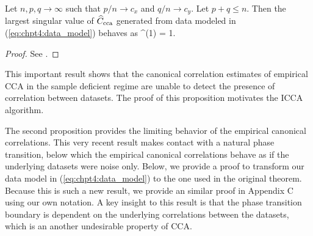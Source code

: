 \begin{prop}\label{prop:pezeshki}
Let $n,p,q\to\infty$ such that $p/n\to c_x$ and $q/n\to c_y$. Let $p+q\leq n$. Then the
largest singular value of $\widehat{C}_{\text{cca}}$ generated from data modeled in (\ref{eq:chpt4:data_model})
behaves as 
\be
\rhohatcca^{(1)} = 1.
\ee
\end{prop}
\begin{proof}
See \cite{pezeshki2004empirical}.
\end{proof}

This important result shows that the canonical correlation estimates of empirical CCA in
the sample deficient regime are unable to detect the presence of correlation between
datasets. The proof of this proposition motivates the ICCA algorithm. 

The second proposition provides the limiting behavior of the empirical canonical
correlations. This very recent result makes contact with a natural phase transition, below
which the empirical canonical correlations behave as if the underlying datasets were noise
only. Below, we provide a proof to transform our data model in (\ref{eq:chpt4:data_model})
to the one used in the original theorem. Because this is such a new result, we provide an
similar proof in Appendix C using our own notation. A key insight to this result is that
the phase transition boundary is dependent on the underlying correlations between the
datasets, which is an another undesirable property of CCA. 

